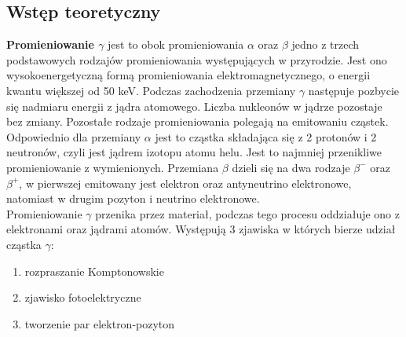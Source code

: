 \documentclass[a4paper]{article}
\begin{document}
\subsection{Wstęp teoretyczny}
\textbf{Promieniowanie $\gamma$} jest to obok promieniowania $\alpha$ oraz $\beta$ jedno z trzech podstawowych rodzajów promieniowania występujących w przyrodzie. Jest ono wysokoenergetyczną formą promieniowania elektromagnetycznego, o energii kwantu większej od 50 keV. Podczas zachodzenia przemiany $\gamma$ następuje pozbycie się nadmiaru energii z jądra atomowego. Liczba nukleonów w jądrze pozostaje bez zmiany. Pozostałe rodzaje promieniowania polegają na emitowaniu cząstek. Odpowiednio dla przemiany $\alpha$ jest to cząstka składająca się z 2 protonów i 2 neutronów, czyli jest jądrem izotopu atomu helu. Jest to najmniej przenikliwe promieniowanie z wymienionych. Przemiana $\beta$ dzieli się na dwa rodzaje $\beta^{-}$ oraz $\beta^{+}$, w pierwszej emitowany jest elektron oraz antyneutrino elektronowe, natomiast w drugim pozyton i neutrino elektronowe. \\
Promieniowanie $\gamma$ przenika przez materiał, podczas tego procesu oddziałuje ono z elektronami oraz jądrami atomów. Występują 3 zjawiska w których bierze udział cząstka $\gamma$:
\begin{enumerate}
	\item{rozpraszanie Komptonowskie}
	\item{zjawisko fotoelektryczne}
	\item{tworzenie par elektron-pozyton}
\end{enumerate}
 
\end{document}
